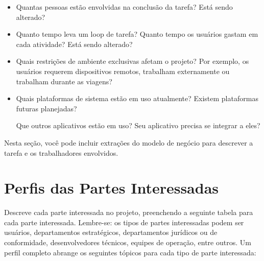 \documentclass{report}
\begin{document}
\begin{itemize}

	\item
	      Quantas pessoas estão envolvidas na conclusão da tarefa? Está sendo alterado?

	\item
	      Quanto tempo leva um loop de tarefa? Quanto tempo os usuários gastam em cada
	      atividade? Está sendo alterado?

	\item
	      Quais restrições de ambiente exclusivas afetam o projeto? Por exemplo, os
	      usuários requerem dispositivos remotos, trabalham externamente ou trabalham
	      durante as viagens?

	\item
	      Quais plataformas de sistema estão em uso atualmente? Existem plataformas
	      futuras planejadas?

	      Que outros aplicativos estão em uso? Seu aplicativo precisa se integrar a eles?

\end{itemize}

Nesta seção, você pode incluir extrações do modelo de negócio para descrever a
tarefa e os trabalhadores envolvidos.

\section{Perfis das Partes Interessadas}

Descreve cada parte interessada no projeto, preenchendo a seguinte tabela para
cada parte interessada. Lembre-se: os tipos de partes interessadas podem ser
usuários, departamentos estratégicos, departamentos jurídicos ou de
conformidade, desenvolvedores técnicos, equipes de operação, entre outros. Um
perfil completo abrange os seguintes tópicos para cada tipo de parte
interessada:
\end{document}
